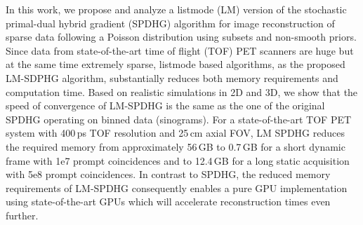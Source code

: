In this work, we propose and analyze a listmode (LM) version of the stochastic primal-dual hybrid 
gradient (SPDHG) algorithm for image reconstruction of sparse data following a Poisson distribution 
using subsets and non-smooth priors. 
Since data from state-of-the-art time of flight (TOF) PET scanners are huge but at the same time
extremely sparse, listmode based algorithms, as the proposed LM-SDPHG algorithm,  
substantially reduces both memory requirements and computation time. 
Based on realistic simulations in 2D and 3D, we show that the speed of convergence of LM-SPDHG 
is the same as the one of the original SPDHG operating on binned data (sinograms).
For a state-of-the-art TOF PET system with 400\,ps TOF resolution and 25\,cm axial FOV,
LM SPDHG reduces the required memory from approximately 56\,GB to
0.7\,GB for a short dynamic frame with 1e7 prompt coincidences and to 12.4\,GB for a long 
static acquisition with 5e8 prompt coincidences.
In contrast to SPDHG, the reduced memory requirements of LM-SPDHG consequently enables a pure GPU implementation 
using state-of-the-art GPUs which will accelerate reconstruction times even further.
